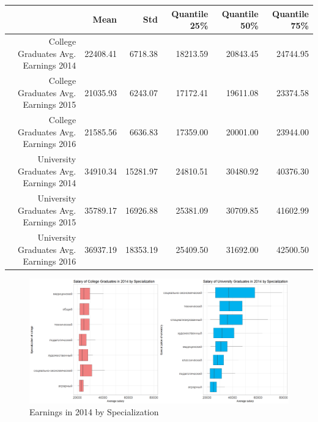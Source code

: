 \documentclass[alpha-refs]{wiley-article-05g}
\begin{document}
\begin{table}[htbp!]
	\centering
	\begin{tabular}{rrrrrr}
		\hline
		& Mean & Std & Quantile 25\% & Quantile 50\% & Quantile 75\% \\ 
		\hline
		College Graduates Avg. Earnings 2014 & 22408.41 & 6718.38 & 18213.59 & 20843.45 & 24744.95 \\ 
		College Graduates Avg. Earnings 2015 & 21035.93 & 6243.07 & 17172.41 & 19611.08 & 23374.58 \\ 
		College Graduates Avg. Earnings 2016 & 21585.56 & 6636.83 & 17359.00 & 20001.00 & 23944.00 \\ 
		University Graduates Avg. Earnings 2014 & 34910.34 & 15281.97 & 24810.51 & 30480.92 & 40376.30 \\ 
		University Graduates Avg. Earnings 2015 & 35789.17 & 16926.88 & 25381.09 & 30709.85 & 41602.99 \\ 
		University Graduates Avg. Earnings 2016 & 36937.19 & 18353.19 & 25409.50 & 31692.00 & 42500.50 \\ 
		\hline
	\end{tabular}
\end{table}


\begin{figure}[H]
	\centering
	\includegraphics[width=400pt]{box_plot1a.png}
	\caption{Earnings in 2014 by Specialization}\label{fig:1.1}
\end{figure}

\newpage
\end{document}
